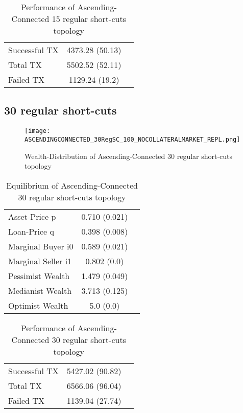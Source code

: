 \documentclass[Bachelorarbeit.tex]{subfiles}
\begin{document}
\begin{table}[H]
	\caption{Performance of Ascending-Connected 15 regular short-cuts topology}
	\centering
	\begin{tabular} { l c r }
		\hline
		Successful TX & 4373.28 (50.13) \\
		Total TX & 5502.52 (52.11) \\
		Failed TX & 1129.24 (19.2) \\
		\hline
	\end{tabular}
\end{table}

\subsection{30 regular short-cuts}
\begin{figure}[H]
	\centering
  \texttt{[image: ASCENDINGCONNECTED\_30RegSC\_100\_NOCOLLATERALMARKET\_REPL.png]}
	\caption{Wealth-Distribution of Ascending-Connected 30 regular short-cuts topology}
	\label{fig:wealth_ASCENDINGCONNECTED_30RegSC_100_NOCOLLATERALMARKET_REPL}
\end{figure}

\begin{table}[H]
	\caption{Equilibrium of Ascending-Connected 30 regular short-cuts topology}
	\centering
	\begin{tabular} { l c r }
		\hline
		Asset-Price p & 0.710 (0.021) \\
		Loan-Price q & 0.398 (0.008) \\
		Marginal Buyer i0 & 0.589 (0.021) \\
		Marginal Seller i1 & 0.802 (0.0) \\
		\hline
		Pessimist Wealth & 1.479 (0.049) \\
		Medianist Wealth & 3.713 (0.125) \\
		Optimist Wealth & 5.0 (0.0) \\
		\hline
	\end{tabular}
\end{table} 

\begin{table}[H]
	\caption{Performance of Ascending-Connected 30 regular short-cuts topology}
	\centering
	\begin{tabular} { l c r }
		\hline
		Successful TX & 5427.02 (90.82) \\
		Total TX & 6566.06 (96.04) \\
		Failed TX & 1139.04 (27.74) \\
		\hline
	\end{tabular}
\end{table}
\end{document}
